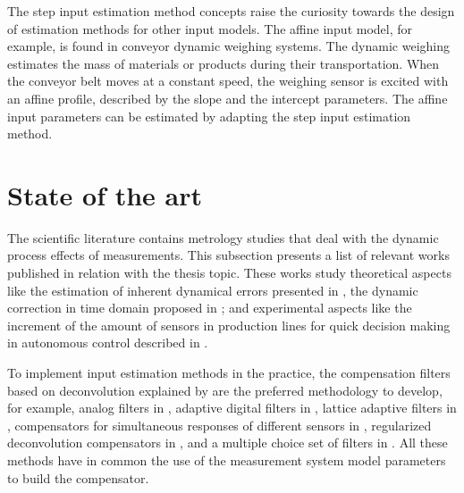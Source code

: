 The step input estimation method concepts raise the curiosity towards the design of estimation methods for other input models.
The affine input model, for example, is found in conveyor dynamic weighing systems.
The dynamic weighing estimates the mass of materials or products during their transportation.
When the conveyor belt moves at a constant speed, the weighing sensor is excited with an affine profile, 
described by the slope and the intercept parameters.
The affine input parameters can be estimated by adapting the step input estimation method.

   
 
\section{State of the art}

The scientific literature contains metrology studies that deal with the dynamic process effects of measurements.
This subsection presents a list of relevant works published in relation with the thesis topic. 
These works study theoretical aspects like the estimation of inherent dynamical errors presented in \citet{Hessling06}, the dynamic correction in time domain proposed in \citet{Hessling08a}; and experimental aspects like the increment of the amount of sensors in production lines for quick decision making in autonomous control described in \citet{Esward09}.  

To implement input estimation methods in the practice, the compensation filters based on deconvolution explained by \citet{Eichstadt10} are the preferred methodology to develop, for example, 
analog filters in \citet{Jafaripanah05}, 
adaptive digital filters in \citet{Shu93}, 
lattice adaptive filters in \citet{Hernandez06}, 
compensators for simultaneous responses of different sensors in \citet{Boschetti13}, 
regularized deconvolution compensators in \citet{Dienstfrey14}, 
and a multiple choice set of filters in \citet{Huang16}. 
All these methods have in common the use of the measurement system model parameters to build the compensator.



